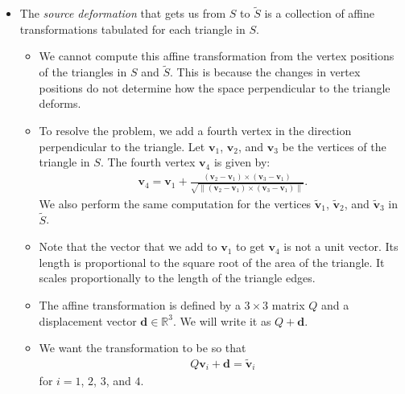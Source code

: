 \documentclass[10pt]{article}
\newcommand{\ve}[1]{\mathbf{#1}}
\newcommand{\Real}{\mathbb{R}}
\begin{document}
\begin{itemize}
    \item The \emph{source deformation} that gets us from $S$ to $\widetilde{S}$ is a collection of affine transformations tabulated for each triangle in $S$.
    
    \begin{itemize}
        \item We cannot compute this affine transformation from the vertex positions of the triangles in $S$ and $\widetilde{S}$. This is because the changes in vertex positions do not determine how the space perpendicular to the triangle deforms.
        
        \item To resolve the problem, we add a fourth vertex in the direction perpendicular to the triangle. Let $\ve{v}_1$, $\ve{v}_2$, and $\ve{v}_3$ be the vertices of the triangle in $S$. The fourth vertex $\ve{v}_4$ is given by:
        \begin{align*}
            \ve{v}_4 = \ve{v}_1 + \frac{(\ve{v}_2 - \ve{v}_1) \times (\ve{v}_3 - \ve{v}_1)}{\sqrt{\| (\ve{v}_2 - \ve{v}_1) \times (\ve{v}_3 - \ve{v}_1) \|}}.
        \end{align*}
        We also perform the same computation for the vertices $\widetilde{\ve{v}}_1$, $\widetilde{\ve{v}}_2$, and $\widetilde{\ve{v}}_3$ in $\widetilde{S}$.

        \item Note that the vector that we add to $\ve{v}_1$ to get $\ve{v}_4$ is not a unit vector. Its length is proportional to the square root of the area of the triangle. It scales proportionally to the length of the triangle edges.
        
        \item The affine transformation is defined by a $3 \times 3$ matrix $Q$ and a displacement vector $\ve{d} \in \Real^3$. We will write it as $Q + \ve{d}$.
    
        \item We want the transformation to be so that
        \begin{align*}
            Q\ve{v}_i + \ve{d} = \widetilde{\ve{v}}_i
        \end{align*}        
        for $i = 1$, $2$, $3$, and $4$.
        

\end{itemize}
\end{itemize}
\end{document}
